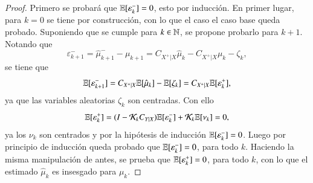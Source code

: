 \begin{proof}
Primero se probará que $\mathbb{E}[\varepsilon_k^-] = 0$, esto por inducción. En primer lugar, para $k=0$ se tiene por construcción, con lo que el caso el caso base queda probado. Suponiendo que se cumple para $k \in \mathbb{N}$, se propone probarlo para $k+1$. Notando que 
\begin{equation*}
    \varepsilon_{k+1}^- = \hat{\mu}_{k+1}^- - \mu_{k+1} = C_{X^+|X} \hat{\mu}_k - C_{X^+|X} \mu_k - \zeta_k,
\end{equation*}
se tiene que
\begin{equation*}
    \mathbb{E}[\varepsilon_{k+1}^-] = C_{X^+|X} \mathbb{E} [\hat{\mu}_k] - \mathbb{E}[\zeta_k] = C_{X^+|X} \mathbb{E}[\varepsilon^+_k],
\end{equation*}
ya que las variables aleatorias $\zeta_k$ son centradas. Con ello
\begin{equation*}
    \mathbb{E}[\varepsilon^+_k] = ( I - \mathcal{K}_k C_{Y|X} ) \mathbb{E}[\varepsilon_k^-] + \mathcal{K}_{k} \mathbb{E}[\nu_k] = 0,
\end{equation*}
ya los $\nu_k$ son centrados y por la hipótesis de inducción $\mathbb{E}[\varepsilon_k^-] = 0$. Luego por principio de inducción queda probado que $\mathbb{E}[\varepsilon_k^-] = 0$, para todo $k$.  Haciendo la misma manipulación de antes, se prueba que $\mathbb{E}[\varepsilon^+_k] = 0$, para todo $k$, con lo que el estimado $\hat{\mu}_k$ es insesgado para $\mu_k$.


\end{proof}
